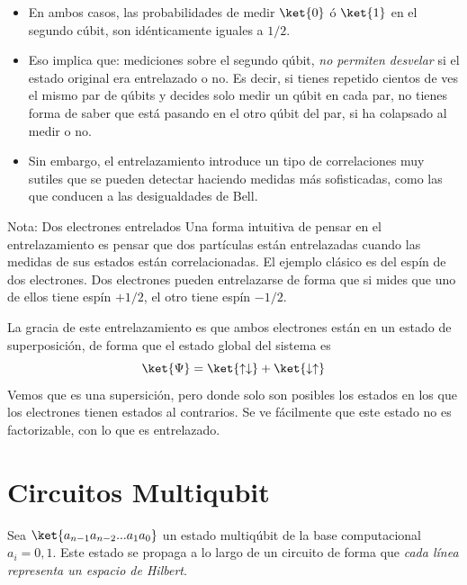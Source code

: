 \documentclass[a4paper,11pt]{book} %
\numberwithin{equation}{chapter}
\begin{document}
\begin{itemize}
	\item En ambos casos,  las probabilidades de medir $\ket{0}$ ó $\ket{1}$ en el segundo cúbit, son idénticamente iguales a $1/2$.
	
	\item Eso implica que: mediciones sobre el segundo qúbit, \textit{no permiten desvelar} si el estado original era entrelazado o no. Es decir, si tienes repetido cientos de ves el mismo par de qúbits y decides solo medir un qúbit en cada par, no tienes forma de saber que está pasando en el otro qúbit del par, si ha colapsado al medir o no.
	
	\item Sin embargo, el entrelazamiento introduce un tipo de correlaciones muy sutiles que se pueden detectar haciendo medidas más sofisticadas, como las que conducen a las desigualdades de Bell. 
\end{itemize}


	\begin{mybox_blue}{Nota: Dos electrones entrelados}
	Una forma intuitiva de pensar en el entrelazamiento es pensar que dos partículas están entrelazadas cuando las medidas de sus estados están correlacionadas. El ejemplo clásico es del espín de dos electrones. Dos electrones pueden entrelazarse de forma que si mides que uno de ellos tiene espín $+1/2$, el otro tiene espín $-1/2$. 

	\vspace{0.3cm}
La gracia de este entrelazamiento es que ambos electrones están en un estado de superposición, de forma que el estado global del sistema es
\begin{equation}
\ket{\Psi} = \ket{\uparrow \downarrow} + \ket{\downarrow\uparrow}
\end{equation}
Vemos que es una supersición, pero donde solo son posibles los estados en los que los electrones tienen estados al contrarios. Se ve fácilmente que este estado no es factorizable, con lo que es entrelazado. 
	\end{mybox_blue}



    \section{Circuitos Multiqubit}

Sea $\ket{a_{n-1}a_{n-2}...a_1a_0}$ un estado multiqúbit de la base computacional $a_{i} = 0,1$. Este estado se propaga a lo largo de un circuito de forma que \textit{cada línea representa un espacio de Hilbert}. 
\end{document}
